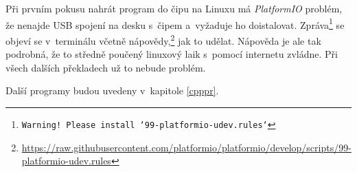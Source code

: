Při prvním pokusu nahrát program do čipu na Linuxu má {\it PlatformIO} problém, 
že nenajde USB spojení na desku s~čipem a~vyžaduje ho doistalovat. 
Zpráva\footnote{\tt Warning! Please install `99-platformio-udev.rules`} 
se objeví se v~terminálu včetně nápovědy,\footnote{\url{https://raw.githubusercontent.com/platformio/platformio/develop/scripts/99-platformio-udev.rules}}
jak to udělat. Nápověda je ale tak podrobná, že to středně poučený linuxový laik s~pomocí internetu zvládne. Při všech dalších překladech už to nebude problém.  

Další programy budou uvedeny v~kapitole \ref{cpppr}.
